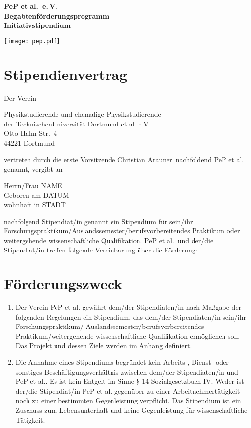 \documentclass[
  paper=a4,
  fontsize=12pt,
  DIV=16,
  parskip=full,
  headinclude=true,
]{scrartcl}
\date{05. August 2024}
\newcommand\vorsitzender{Christian Arauner}
\newcommand\stipendiat{NAME}		%
\newcommand\stipgeburt{DATUM}		%
\newcommand\stipanschrift{STADT}	%
\begin{document}
  \begin{minipage}{0.45\textwidth}%
	  \large\bfseries PeP et al.\ e.\,V.\\%
	  Begabtenförderungsprogramm –\\%
	  Initiativstipendium%
  \end{minipage}%
  \hfill%
  \begin{minipage}{0.45\textwidth}%
	\hfill\texttt{[image: pep.pdf]}
  \end{minipage}%
\section*{Stipendienvertrag}

Der Verein

Physikstudierende und ehemalige Physikstudierende\\
der TechnischenUniversität Dortmund et al. e.V.\\
Otto-Hahn-Str.~4\\
44221 Dortmund

vertreten durch die erste Vorsitzende \vorsitzender\ nachfoldend
PeP et al. genannt, vergibt an

Herrn/Frau \stipendiat\\
Geboren am \stipgeburt\\
wohnhaft in \stipanschrift

nachfolgend Stipendiat/in genannt ein Stipendium für sein/ihr
Forschungspraktikum/Auslandssemester/berufsvorbereitendes Praktikum oder
weitergehende wissenschaftliche Qualifikation.
PeP et al.\ und der/die Stipendiat/in treffen folgende Vereinbarung über die
Förderung:

\section{Förderungszweck}

\begin{enumerate}[\qquad(1)]
	\item Der Verein PeP et al. gewährt dem/der Stipendiaten/in nach
		Maßgabe der folgenden Regelungen ein Stipendium, das
		dem/der Stipendiaten/in sein/ihr Forschungspraktikum/
		Auslandssemester/berufsvorbereitendes Praktikum/weitergehende
		wissenschaftliche Qualifikation ermöglichen soll.
		Das Projekt und dessen Ziele werden im Anhang definiert.
	\item Die Annahme eines Stipendiums begründet kein Arbeits-, Dienst-
		oder sonstiges Beschäftigungsverhältnis zwischen dem/der
		Stipendiaten/in und PeP et al.. Es ist kein Entgelt im Sinne
		§ 14 Sozialgesetzbuch IV. Weder ist der/die Stipendiat/in
		PeP et al. gegenüber zu einer Arbeitnehmertätigkeit
		noch zu einer bestimmten Gegenleistung verpflicht.
		Das Stipendium ist ein Zuschuss zum Lebensunterhalt und
		keine Gegenleistung für wissenschaftliche Tätigkeit.
\end{enumerate}
\end{document}
